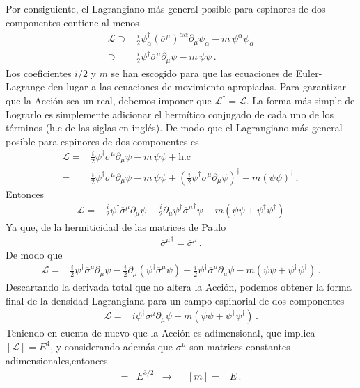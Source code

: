 \begin{frame}
Por consiguiente, el Lagrangiano más general posible para espinores de dos componentes contiene al menos
\begin{align}
    \mathcal{L}\supset&\frac{i}{2}{\psi}^{\dagger}_{\dot{\alpha}}\left(\overline{\sigma}^{\mu}\right)^{\dot{\alpha}\alpha}\partial_\mu\psi_{\alpha}-m\,\psi^{\alpha}\psi_{\alpha} \nonumber\\
\supset&\frac{i}{2}{\psi}^{\dagger}\overline{\sigma}^\mu\partial_\mu\psi-m\,\psi\psi\,.
\end{align}
Los coeficientes $i/2$ y $m$ se han escogido para que las ecuaciones de Euler-Lagrange den lugar a las ecuaciones de movimiento apropiadas.
Para garantizar que la Acción sea un real, debemos imponer que  $\mathcal{L}^{\dagger}=\mathcal{L}$. La forma más simple de Lograrlo es simplemente adicionar el hermítico conjugado de cada uno de los términos (h.c de las siglas en inglés). De modo que el Lagrangiano más general posible para espinores de dos componentes es
\begin{align*}
  \mathcal{L}=&\frac{i}{2}{\psi}^{\dagger}\overline{\sigma}^\mu\partial_\mu\psi-m\,\psi\psi+
\text{h.c} \nonumber\\
=&\frac{i}{2}{\psi}^{\dagger}\overline{\sigma}^\mu\partial_\mu\psi-m\,\psi\psi+
\left(\frac{i}{2} {\psi}^{\dagger}\overline{\sigma}^\mu\partial_\mu\psi \right)^{\dagger}-m \left(\psi\psi  \right)^{\dagger}\,,
\end{align*}
Entonces
\begin{align*}
  \mathcal{L}=&\frac{i}{2}{\psi}^{\dagger}\overline{\sigma}^\mu\partial_\mu\psi-\frac{i}{2} \partial_\mu\psi^{\dagger}{\overline{\sigma}^\mu}^{\dagger}\psi-m \left( \psi\psi+\psi^{\dagger}\psi^{\dagger} \right)
\end{align*}
Ya que, de la hermiticidad de las matrices de Paulo
\begin{align}
{\overline{\sigma}^\mu}^{\dagger}=\overline{\sigma}^\mu\,.
\end{align}
De modo que
\begin{align}
\mathcal{L}=&\frac{i}{2}{\psi}^{\dagger}\overline{\sigma}^\mu\partial_\mu\psi-\frac{i}{2} \partial_\mu \left(  \psi^{\dagger} \overline{\sigma}^\mu\psi\right)
+\frac{i}{2}{\psi}^{\dagger}\overline{\sigma}^\mu\partial_\mu\psi
-m \left( \psi\psi+\psi^{\dagger}\psi^{\dagger} \right)\,.
\end{align}
Descartando la derivada total que no altera la Acción, podemos obtener la forma final de la densidad Lagrangiana para un campo espinorial de dos componentes
\begin{align}
  \mathcal{L}=&i{\psi}^{\dagger}\overline{\sigma}^\mu\partial_\mu\psi-
m \left( \psi\psi+\psi^{\dagger}\psi^{\dagger} \right)\,.
\end{align}
Teniendo en cuenta de nuevo que la Acción es adimensional, que implica $[\mathcal{L}]=E^4$, y considerando además que $\sigma^{\mu}$ son matrices constantes adimensionales,entonces
\begin{align*}
  [\psi]=&E^{3/2}&\to&& [m]=&E\,.
\end{align*}




\end{frame}
